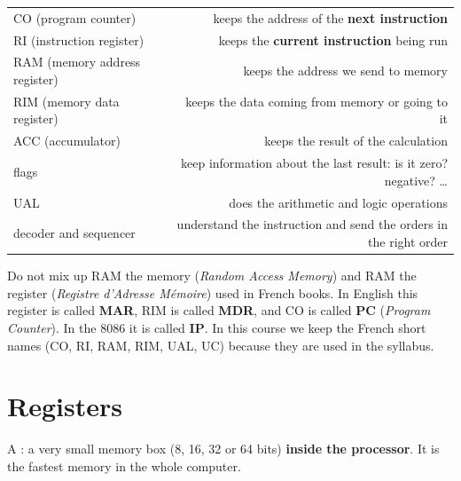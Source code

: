 \begin{center}
\small
\begin{tabularx}{\linewidth}{|>{\centering\arraybackslash}p{4cm}|R|}
    \hline
     &  \\ \hline
    CO (program counter) & keeps the address of the \textbf{next instruction} \\ \hline
    RI (instruction register) & keeps the \textbf{current instruction} being run \\ \hline
    RAM (memory address register) & keeps the address we send to memory \\ \hline
    RIM (memory data register) & keeps the data coming from memory or going to it \\ \hline
    ACC (accumulator) & keeps the result of the calculation \\ \hline
    flags & keep information about the last result: is it zero? negative? \dots \\ \hline
    UAL & does the arithmetic and logic operations \\ \hline
    decoder and sequencer & understand the instruction and send the orders in the right order \\ \hline
\end{tabularx}
\end{center}

\begin{intabih}
    Do not mix up RAM the memory (\emph{Random Access Memory}) and RAM the register (\emph{Registre d'Adresse
    Mémoire}) used in French books. In English this register is called \textbf{MAR}, RIM is called \textbf{MDR},
    and CO is called \textbf{PC} (\emph{Program Counter}). In the 8086 it is called \textbf{IP}.
    In this course we keep the French short names (CO, RI, RAM, RIM, UAL, UC) because they are used in the syllabus.
\end{intabih}

\section{Registers}

\begin{tarif}
    A : a very small memory box (8, 16, 32 or 64 bits) \textbf{inside the processor}.
    It is the fastest memory in the whole computer.
\end{tarif}

